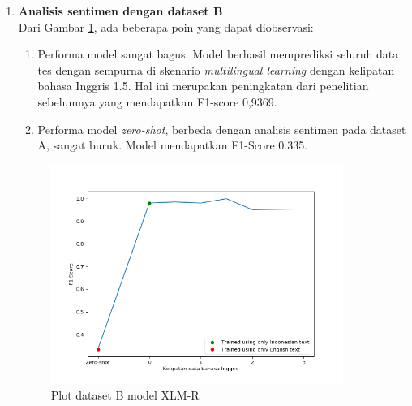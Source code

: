 \begin{enumerate}
            \item \textbf{Analisis sentimen dengan dataset B} \\
            Dari Gambar \ref{fig:plot_full_prosa_xlmr}, ada beberapa poin yang dapat diobservasi:
            \begin{enumerate}
                \item Performa model sangat bagus. Model berhasil memprediksi seluruh data tes dengan sempurna di skenario \textit{multilingual learning} dengan kelipatan bahasa Inggris 1.5. Hal ini merupakan peningkatan dari penelitian sebelumnya yang mendapatkan F1-score 0,9369.
                \item Performa model \textit{zero-shot}, berbeda dengan analisis sentimen pada dataset A, sangat buruk. Model mendapatkan F1-Score  0.335.
            \end{enumerate} 

            \begin{figure}[htb]
                \centering
                \includegraphics[width=0.9\textwidth]{resources/plot-full-prosa-xlmr.png}
                \caption{Plot dataset B model XLM-R}
                \label{fig:plot_full_prosa_xlmr}
            \end{figure}


\end{enumerate}
